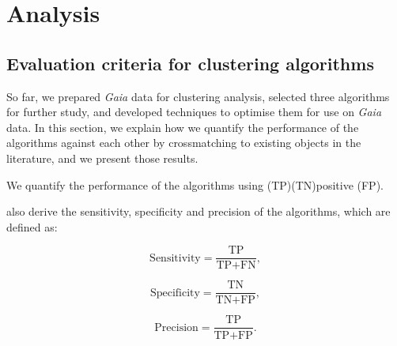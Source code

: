 
\section{Analysis}\label{c2:sec:results}
\subsection{Evaluation criteria for clustering algorithms}

So far, we prepared \emph{Gaia} data for clustering analysis, selected three algorithms for further study, and developed techniques to optimise them for use on \emph{Gaia} data. In this section, we explain how we quantify the performance of the algorithms against each other by crossmatching to existing objects in the literature, and we present those results.

We quantify the performance of the algorithms using (TP)(TN)positive (FP).

also derive the sensitivity, specificity and precision of the algorithms, which are defined as:

\begin{equation}
    \text{Sensitivity} = \frac{\text{TP}}{\text{TP} + \text{FN}},
\end{equation}

\begin{equation}
    \text{Specificity} = \frac{\text{TN}}{\text{TN} + \text{FP}},
\end{equation}

\begin{equation}
    \text{Precision} = \frac{\text{TP}}{\text{TP} + \text{FP}}.
\end{equation}

